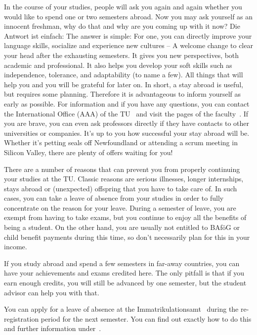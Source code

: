 In the course of your studies, people will ask you again and again whether you would like to spend one or two semesters abroad.
Now you may ask yourself as an innocent freshman, why do that and why are you coming up with it now?
Die Antwort ist einfach:
The answer is simple:
For one, you can directly improve your language skills, socialize and experience new cultures -- A welcome change to clear your head after the exhausting semesters. It gives you new perspectives, both academic and professional. It also helps you develop your soft skills such as independence, tolerance, and adaptability (to name a few). All things that will help you and you will be grateful for later on.
In short, a stay abroad is useful, but requires some planning.
Therefore it is advantageous to inform yourself as early as possible.
For information and if you have any questions, you can contact the International Office (AAA) of the TU~ and visit the pages of the faculty~.
If you are brave, you can even ask professors directly if they have contacts to other universities or companies.
It's up to you how successful your stay abroad will be.
Whether it's petting seals off Newfoundland or attending a scrum meeting in Silicon Valley, there are plenty of offers waiting for you!


There are a number of reasons that can prevent you from properly continuing your studies at the TU. Classic reasons are serious illnesses, longer internships, stays abroad or (unexpected) offspring that you have to take care of. In such cases, you can take a leave of absence from your studies in order to fully concentrate on the reason for your leave. During a semester of leave, you are exempt from having to take exams, but you continue to enjoy all the benefits of being a student. On the other hand, you are usually not entitled to BAföG or child benefit payments during this time, so don't necessarily plan for this in your income.

If you study abroad and spend a few semesters in far-away countries, you can have your achievements and exams credited here. The only pitfall is that if you earn enough credits, you will still be advanced by one semester, but the student advisor can help you with that.

You can apply for a leave of absence at the Immatrikulationsamt~ during the re-registration period for the next semester. You can find out exactly how to do this and further information under~.
